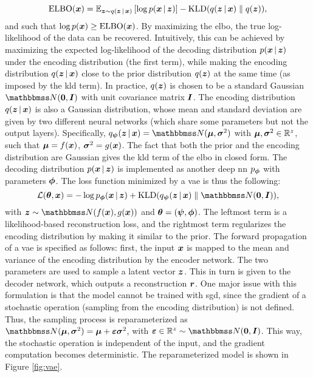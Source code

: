 $$\Fun{ELBO}(\Vector{x}) = \Expectation{\Vector{z} \sim q(\Vector{z} \given \Vector{x})}{\log p(\Vector{x} \given \Vector{z})} - \KLD{q(\Vector{z} \given \Vector{x})}{q(\Vector{z})},$$
and such that $\log p(\Vector{x}) \geq \Fun{ELBO}(\Vector{x})$. By maximizing the \gls{elbo}, the true log-likelihood of the data can be recovered. Intuitively, this can be achieved by maximizing the expected log-likelihood of the decoding distribution $p(\Vector{x} \given \Vector{z})$ under the encoding distribution (the first term), while making the encoding distribution $q(\Vector{z} \given \Vector{x})$ close to the prior distribution $q(\Vector{z})$ at the same time (as imposed by the \gls{kld} term). In practice, $q(\Vector{z})$ is chosen to be a standard Gaussian $\Normal{\Zeros}{\Identity}$ with unit covariance matrix $\Identity$. The encoding distribution $q(\Vector{z} \given \Vector{x})$ is also a Gaussian distribution, whose mean and standard deviation are given by two different neural networks (which share some parameters but not the output layers). Specifically,
$\Encoder(\Vector{z} \given \Vector{x}) = \Normal{\MeanVec}{\StdVec}$ with $\boldsymbol{\mu},\boldsymbol{\sigma}^2 \in \mathbb{R}^z$, such that $\MeanVec = f(\Vector{x})$, $\StdVec = g(\Vector{x})$. The fact that both the prior and the encoding distribution are Gaussian gives the \gls{kld} term of the \gls{elbo} in closed form. The decoding distribution $p(\Vector{x} \given \Vector{z})$ is implemented as another deep \gls{nn} $p_{\boldsymbol{\phi}}$ with parameters $\boldsymbol{\phi}$. The loss function minimized by a \gls{vae} is thus the following:
$$\Loss(\Param, \Vector{x}) = - \log \Decoder(\Vector{x} \given \Vector{z}) + \KLD{\Encoder(\Vector{z} \given \Vector{x})}{\Normal{\Zeros}{\Identity}},$$
with $\Vector{z} \sim \Normal{f(\Vector{x})}{g(\Vector{x})}$ and $\boldsymbol{\theta} = (\boldsymbol{\psi},\boldsymbol{\phi})$. The leftmost term is a likelihood-based reconstruction loss, and the rightmost term regularizes the encoding distribution by making it similar to the prior. The forward propagation of a \gls{vae} is specified as follows: first, the input $\Vector{x}$ is mapped to the mean and variance of the encoding distribution by the encoder network. The two parameters are used to sample a latent vector $\Vector{z}$. This in turn is given to the decoder network, which outputs a reconstruction $\Vector{r}$. One major issue with this formulation is that the model cannot be trained with \gls{sgd}, since the gradient of a stochastic operation (sampling from the encoding distribution) is not defined. Thus, the sampling process is reparameterized as $\Normal{\MeanVec}{\StdVec} = \MeanVec + \boldsymbol{\eps}\StdVec$, with $\boldsymbol{\eps} \in \Real^z \sim \Normal{\Zeros}{\Identity}$. This way, the stochastic operation is independent of the input, and the gradient computation becomes deterministic. The reparameterized model is shown in Figure \ref{fig:vae}.
